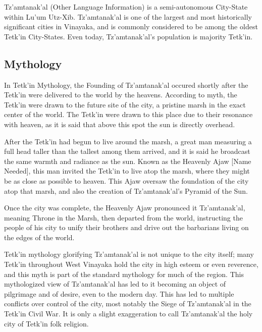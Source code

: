 Tz'amtanak'al (Other Language Information) is a semi-autonomous City-State within Lu'um Utz-Xib. Tz'amtanak'al is one of the largest and most historically significant cities in Vinayaka, and is commonly considered to be among the oldest Tetk'in City-States. Even today, Tz'amtanak'al's population is majority Tetk'in.
	\subsection{Mythology}
	In Tetk'in Mythology, the Founding of Tz'amtanak'al occured shortly after the Tetk'in were delivered to the world by the heavens. According to myth, the Tetk'in were drawn to the future site of the city, a pristine marsh in the exact center of the world. The Tetk'in were drawn to this place due to their resonance with heaven, as it is said that above this spot the sun is directly overhead.\par
	After the Tetk'in had begun to live around the marsh, a great man measuring a full head taller than the tallest among them arrived, and it is said he broadcast the same warmth and radiance as the sun. Known as the Heavenly Ajaw [Name Needed], this man invited the Tetk'in to live atop the marsh, where they might be as close as possible to heaven. This Ajaw oversaw the foundation of the city atop that marsh, and also the creation of Tz'amtanak'al's Pyramid of the Sun. \par 
	Once the city was complete, the Heavenly Ajaw pronounced it Tz'amtanak'al, meaning Throne in the Marsh, then departed from the world, instructing the people of his city to unify their brothers and drive out the barbarians living on the edges of the world.\par
	Tetk'in mythology glorifying Tz'amtanak'al is not unique to the city itself; many Tetk'in throughout West Vinayaka hold the city in high esteem or even reverence, and this myth is part of the standard mythology for much of the region. This mythologized view of Tz'amtanak'al has led to it becoming an object of pilgrimage and of desire, even to the modern day. This has led to multiple conflicts over control of the city, most notably the Siege of Tz'amtanak'al in the Tetk'in Civil War. It is only a slight exaggeration to call Tz'amtanak'al the holy city of Tetk'in folk religion.